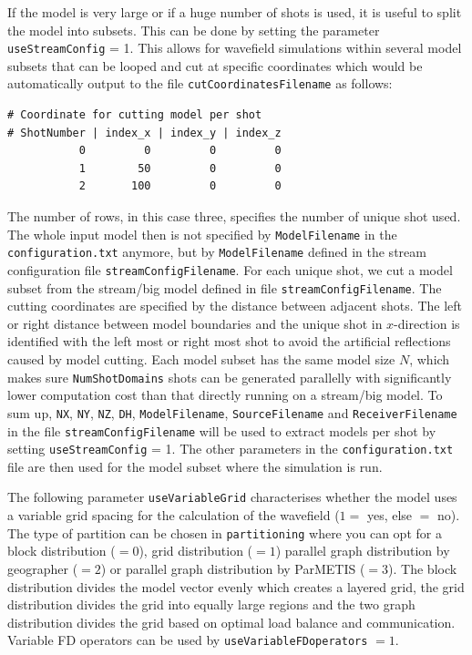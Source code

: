 \documentclass[pdftex,a4paper,parskip,listof=totoc,bibliography=totoc,onehalfspacing,12pt]{scrreprt}
\newcommand{\shellcmd}[1]{\indent\indent\texttt{#1}}	%
\begin{document}
If the model is very large or if a huge number of shots is used, it is useful to split the model into subsets. This can be done by setting the parameter \verb+useStreamConfig+ = 1. This allows for wavefield simulations within several model subsets that can be looped and cut at specific coordinates which would be automatically output to the file \verb+cutCoordinatesFilename+ as follows:
\begin{verbatim}
# Coordinate for cutting model per shot 
# ShotNumber | index_x | index_y | index_z
           0         0         0         0
           1        50         0         0
           2       100         0         0
\end{verbatim}
The number of rows, in this case three, specifies the number of unique shot used. The whole input model then is not specified by \verb+ModelFilename+ in the \shellcmd{configuration.txt} anymore, but by \verb+ModelFilename+ defined in the stream configuration file \verb+streamConfigFilename+. For each unique shot, we cut a model subset from the stream/big model defined in file \verb+streamConfigFilename+. The cutting coordinates are specified by the distance between adjacent shots. The left or right distance between model boundaries and the unique shot in $x$-direction is identified with the left most or right most shot to avoid the artificial reflections caused by model cutting. Each model subset has the same model size $N$, which makes sure \verb+NumShotDomains+ shots can be generated parallelly with significantly lower computation cost than that directly running on a stream/big model. To sum up, \verb+NX+, \verb+NY+, \verb+NZ+, \verb+DH+, \verb+ModelFilename+, \verb+SourceFilename+ and \verb+ReceiverFilename+ in the file \verb+streamConfigFilename+ will be used to extract models per shot by setting \verb+useStreamConfig+ = 1. The other parameters in the \shellcmd{configuration.txt} file are then used for the model subset where the simulation is run. 

The following parameter \verb+useVariableGrid+ characterises whether the model uses a variable grid spacing for the calculation of the wavefield ($1=$ yes, else $=$ no). 
The type of partition can be chosen in \verb+partitioning+ where you can opt for a block distribution ($=0$), grid distribution ($=1$) parallel graph distribution by geographer ($=2$) or parallel graph distribution by ParMETIS ($=3$).
The block distribution divides the model vector evenly which creates a layered grid, the grid distribution divides the grid into equally large regions and the two graph distribution divides the grid based on optimal load balance and communication.
Variable FD operators can be used by \verb+useVariableFDoperators+ $=1$.
\end{document}
